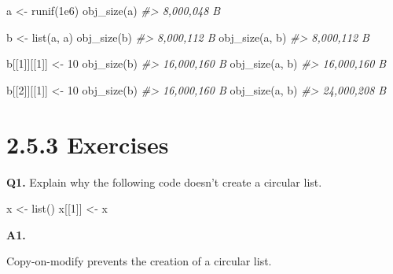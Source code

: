 \documentclass[
]{book}
\newenvironment{Shaded}{\begin{snugshade}}{\end{snugshade}}
\newcommand{\CommentTok}[1]{\textcolor[rgb]{0.56,0.35,0.01}{\textit{#1}}}
\newcommand{\DecValTok}[1]{\textcolor[rgb]{0.00,0.00,0.81}{#1}}
\newcommand{\FloatTok}[1]{\textcolor[rgb]{0.00,0.00,0.81}{#1}}
\newcommand{\FunctionTok}[1]{\textcolor[rgb]{0.00,0.00,0.00}{#1}}
\newcommand{\NormalTok}[1]{#1}
\newcommand{\OtherTok}[1]{\textcolor[rgb]{0.56,0.35,0.01}{#1}}
\begin{document}
\begin{Shaded}
\begin{Highlighting}[]
\NormalTok{a }\OtherTok{\textless{}{-}} \FunctionTok{runif}\NormalTok{(}\FloatTok{1e6}\NormalTok{)}
\FunctionTok{obj\_size}\NormalTok{(a)}
\CommentTok{\#\textgreater{} 8,000,048 B}

\NormalTok{b }\OtherTok{\textless{}{-}} \FunctionTok{list}\NormalTok{(a, a)}
\FunctionTok{obj\_size}\NormalTok{(b)}
\CommentTok{\#\textgreater{} 8,000,112 B}
\FunctionTok{obj\_size}\NormalTok{(a, b)}
\CommentTok{\#\textgreater{} 8,000,112 B}

\NormalTok{b[[}\DecValTok{1}\NormalTok{]][[}\DecValTok{1}\NormalTok{]] }\OtherTok{\textless{}{-}} \DecValTok{10}
\FunctionTok{obj\_size}\NormalTok{(b)}
\CommentTok{\#\textgreater{} 16,000,160 B}
\FunctionTok{obj\_size}\NormalTok{(a, b)}
\CommentTok{\#\textgreater{} 16,000,160 B}

\NormalTok{b[[}\DecValTok{2}\NormalTok{]][[}\DecValTok{1}\NormalTok{]] }\OtherTok{\textless{}{-}} \DecValTok{10}
\FunctionTok{obj\_size}\NormalTok{(b)}
\CommentTok{\#\textgreater{} 16,000,160 B}
\FunctionTok{obj\_size}\NormalTok{(a, b)}
\CommentTok{\#\textgreater{} 24,000,208 B}
\end{Highlighting}
\end{Shaded}

\hypertarget{exercises-3}{%
\section{2.5.3 Exercises}\label{exercises-3}}

\textbf{Q1.} Explain why the following code doesn't create a circular list.

\begin{Shaded}
\begin{Highlighting}[]
\NormalTok{x }\OtherTok{\textless{}{-}} \FunctionTok{list}\NormalTok{()}
\NormalTok{x[[}\DecValTok{1}\NormalTok{]] }\OtherTok{\textless{}{-}}\NormalTok{ x}
\end{Highlighting}
\end{Shaded}

\textbf{A1.}

Copy-on-modify prevents the creation of a circular list.
\end{document}
